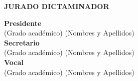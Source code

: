 \thispagestyle{empty}
\begin{singlespacing}
\begin{center}
  \vspace*{2cm}

  {\fontsize{14}{17}\selectfont\textbf{JURADO DICTAMINADOR}}

  \vspace{48pt}

  {\fontsize{12}{15}\selectfont
  \textbf{Presidente}\\[12pt]
  (Grado académico) (Nombres y Apellidos)\\[36pt]

  \textbf{Secretario}\\[12pt]
  (Grado académico) (Nombres y Apellidos)\\[36pt]

  \textbf{Vocal}\\[12pt]
  (Grado académico) (Nombres y Apellidos)}
\end{center}
\end{singlespacing}
\newpage

